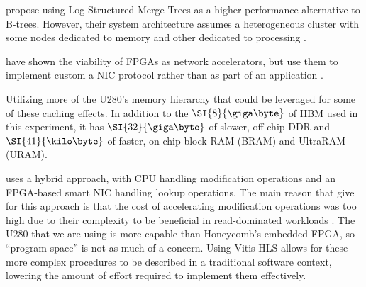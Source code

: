 

\citeauthor{dlsm} propose using Log-Structured Merge Trees as a higher-performance alternative to B-trees. However, their system architecture assumes a heterogeneous cluster with some nodes dedicated to memory and other dedicated to processing \autocite{dlsm}.



\citeauthor{star} have shown the viability of FPGAs as network accelerators, but use them to implement custom a NIC protocol rather than as part of an application \autocite{star}.

Utilizing more of the U280's memory hierarchy that could be leveraged for some of these caching effects. In addition to the $\SI{8}{\giga\byte}$ of HBM used in this experiment, it has $\SI{32}{\giga\byte}$ of slower, off-chip DDR and $\SI{41}{\kilo\byte}$ of faster, on-chip block RAM (BRAM) and UltraRAM (URAM).

 uses a hybrid approach, with CPU handling modification operations and an FPGA-based smart NIC handling lookup operations. The main reason that \citeauthor{honeycomb} give for this approach is that the cost of accelerating modification operations was too high due to their complexity to be beneficial in read-dominated workloads \autocite{honeycomb}. The U280 that we are using is more capable than Honeycomb's embedded FPGA, so ``program space'' is not as much of a concern. Using Vitis HLS allows for these more complex procedures to be described in a traditional software context, lowering the amount of effort required to implement them effectively.
